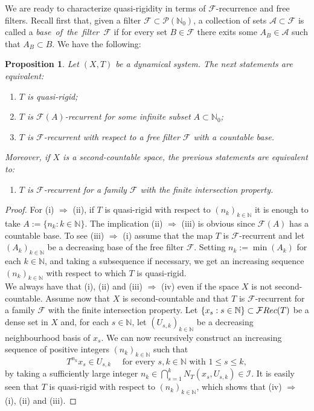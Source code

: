 \documentclass[openright,11pt]{article}
\theoremstyle{plain}
\newtheorem{proposition}[theorem]{Proposition}
\theoremstyle{definition}
\newcommand{\NN}{\mathbb{N}}
\newcommand{\Ac}{\mathcal{A}}
\newcommand{\Fc}{\mathcal{F}}
\newcommand{\Ic}{\mathcal{I}}
\newcommand{\Part}{\mathscr{P}}
\newcommand{\Rec}{\textup{Rec}}
\begin{document}
We are ready to characterize quasi-rigidity in terms of $\Fc$-recurrence and free filters. Recall first that, given a filter $\Fc \subset \Part(\NN_0)$, a collection of sets $\Ac \subset \Fc$ is called a {\em base~of~the~filter~$\Fc$} if for every set $B \in \Fc$ there exits some $A_B \in \Ac$ such that $A_B \subset B$. We have the following:

\begin{proposition}\label{Pro:qr.filter}
	Let $(X,T)$ be a dynamical system. The next statements are equivalent:
	\begin{enumerate}[{\em(i)}]
		\item $T$ is quasi-rigid;
		
		\item $T$ is $\Fc(A)$-recurrent for some infinite subset $A \subset \NN_0$;
		
		\item $T$ is $\Fc$-recurrent with respect to a free filter $\Fc$ with a countable base.
	\end{enumerate}
	Moreover, if $X$ is a second-countable space, the previous statements are equivalent to:
	\begin{enumerate}[{\em(iv)}]
		\item $T$ is $\Fc$-recurrent for a family $\Fc$ with the finite intersection property.
	\end{enumerate}
\end{proposition}
\begin{proof}
	For (i) $\Rightarrow$ (ii), if $T$ is quasi-rigid with respect to $(n_k)_{k\in\NN}$ it is enough to take $A:=\{ n_k : k \in\NN \}$. The implication (ii) $\Rightarrow$ (iii) is obvious since $\Fc(A)$ has a countable base. To see (iii) $\Rightarrow$ (i) assume that the map $T$ is $\Fc$-recurrent and let $(A_k)_{k\in\NN}$ be a decreasing base of the free filter $\Fc$. Setting $n_k := \min(A_k)$ for each $k \in \NN$, and taking a subsequence if necessary, we get an increasing sequence $(n_k)_{k\in\NN}$ with respect to which $T$ is quasi-rigid.\\[-5pt]
	
	We always have that (i), (ii) and (iii) $\Rightarrow$ (iv) even if the space $X$ is not second-countable. Assume now that $X$ is second-countable and that $T$ is $\Fc$-recurrent for a family $\Fc$ with the finite intersection property. Let $\{ x_s : s \in \NN \} \subset \Fc\Rec(T)$ be a dense set in $X$ and, for each $s \in \NN$, let $(U_{s,k})_{k\in\NN}$ be a decreasing neighbourhood basis of $x_s$. We can now recursively construct an increasing sequence of positive integers $(n_k)_{k\in\NN}$ such that
	\[
	T^{n_k}x_s \in U_{s,k} \quad \text{ for every } s,k \in \NN \text{ with } 1\leq s\leq k,
	\]
	by taking a sufficiently large integer $n_k \in \bigcap_{s=1}^k N_T(x_s,U_{s,k}) \in \Ic$. It is easily seen that $T$ is quasi-rigid with respect to $(n_k)_{k\in\NN}$, which shows that (iv) $\Rightarrow$ (i), (ii) and (iii).
\end{proof}
\end{document}

